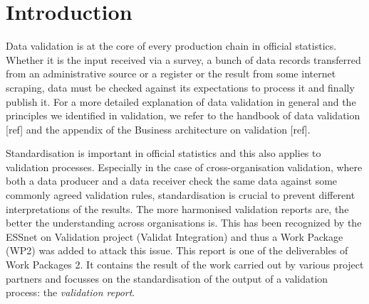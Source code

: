\section{Introduction}
\label{sect:introduction}

Data validation is at the core of every production chain in official statistics.
Whether it is the input received via a survey, a bunch of data records transferred from an administrative source or a register or the result from some internet scraping,
data must be checked against its expectations to process it and finally publish it.
For a more detailed explanation of data validation in general and the principles we identified in validation, we refer to the 
handbook of data validation [ref] and the appendix of the Business architecture on validation [ref].

Standardisation is important in official statistics and this also applies to validation processes.
Especially in the case of cross-organisation validation, where both a data producer and a data receiver check the same data against some
commonly agreed validation rules, standardisation is crucial to prevent different interpretations of the results.
The more harmonised validation reports are, the better the understanding across organisations is.
This has been recognized by the ESSnet on Validation project (Validat Integration) and thus a Work Package (WP2) was added to attack this issue.
This report is one of the deliverables of Work Packages 2.
It contains the result of the work carried out by various project partners and focusses on the standardisation of the output of a validation process: the \emph{validation report}.

